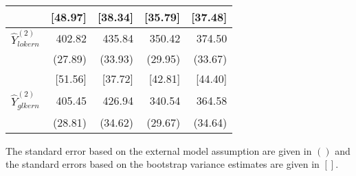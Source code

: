 \documentclass[a4paper,12pt,leqno, titlepage]{article}
\begin{document}
\begin{appendix}
{{{\begin{table}[ht]
\begin{tabular}{rrrrr}
                         & [48.97] & [38.34] & [35.79] & [37.48] \\  \hline
$\hat{Y}^{(2)}_{lokern}$ & 402.82  & 435.84  & 350.42  & 374.50 \\
                         & (27.89) & (33.93) & (29.95) & (33.67) \\
                         & [51.56] & [37.72] & [42.81] & [44.40] \\ \hline
$\hat{Y}^{(2)}_{glkern}$ & 405.45  & 426.94  & 340.54  & 364.58 \\
                         & (28.81) & (34.62) & (29.67) & (34.64) \\
\end{tabular}
\end{table}
The standard error based on the external model assumption are given in $()$ and the standard errors based on the bootstrap variance estimates are given in $[]$.\newpage

\clearpage \newpage

}}}
\end{appendix}
\end{document}
